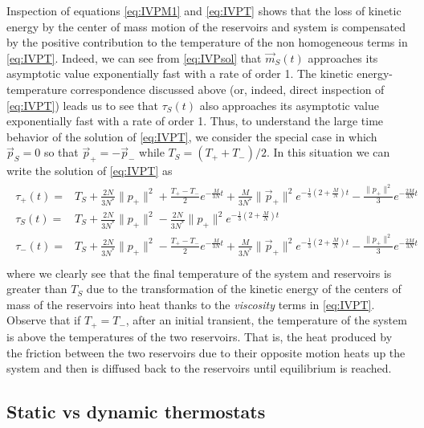 \documentclass{article}
\begin{document}
Inspection of equations \eqref{eq:IVPM1} and \eqref{eq:IVPT} shows that the loss of kinetic energy by the center of mass
motion of the reservoirs and system is compensated by the positive contribution to the temperature of the non
homogeneous terms in \eqref{eq:IVPT}. Indeed, we can see from \eqref{eq:IVPsol} that $\vec m_S(t)$ approaches its
asymptotic value exponentially fast with a rate of order 1. The kinetic energy-temperature correspondence discussed
above (or, indeed, direct inspection of \eqref{eq:IVPT}) leads us to see that $\tau_S(t)$ also approaches its asymptotic
value exponentially fast with a rate of order 1. Thus, to understand the large time behavior of the solution of
\eqref{eq:IVPT}, we consider the special case in which $\vec p_S=0$ so that $\vec p_+=-\vec p_-$ while
$T_S=(T_++T_-)/2$. In this situation we can write the solution of \eqref{eq:IVPT} as
\begin{align*}
\begin{split}
\tau_+(t)=&T_S+\frac {2N}{3N^*}\|p_+\|^2+\frac{T_+-T_-}2e^{-\frac M{3N} t}+\frac{M}{3N^*}\|\vec p_+\|^2e^{-\frac 
13\left(2+\frac 
MN\right)t}-\frac{\|p_+\|^2}3e^{-\frac {2M}{3N} t}\\
\tau_S(t)=&T_S+\frac {2N}{3N^*}\|p_+\|^2-\frac {2N}{3N^*}\|p_+\|^2e^{-\frac 13\left(2+\frac 
MN\right)t}\\
\tau_-(t)=&T_S+\frac {2N}{3N^*}\|p_+\|^2-\frac{T_+-T_-}2e^{-\frac M{3N} t}+\frac{M}{3N^*}\|\vec p_+\|^2e^{-\frac 
13\left(2+\frac 
MN\right)t}-\frac{\|p_+\|^2}3e^{-\frac {2M}{3N} t}\\
\end{split}
\end{align*}
%
where we clearly see that the final temperature of the system and reservoirs is greater than $T_S$ due to the
transformation of the kinetic energy of the centers of mass of the reservoirs into heat thanks to the {\it viscosity}
terms in \eqref{eq:IVPT}. Observe that if $T_+=T_-$, after an initial transient, the temperature of the system is above
the temperatures of the two reservoirs. That is, the heat produced by the friction between the two reservoirs due to
their opposite motion heats up the system and then is diffused back to the reservoirs until equilibrium is reached.



\subsection{Static vs dynamic thermostats}\label{subsec:statdyn}
\end{document}

